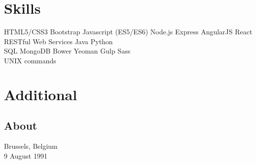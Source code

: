 \documentclass[letterpaper]{my-resume} %
\begin{document}
\begin{minipage}[t]{0.33\textwidth}
\sectionspace %


\section{Skills}

HTML5/CSS3 \textbullet{} Bootstrap \textbullet{} Javascript (ES5/ES6) \textbullet{} Node.js \textbullet{} Express \textbullet{} AngularJS \textbullet{} React \textbullet{} RESTful Web Services \textbullet{} Java \textbullet{} Python \\
SQL \textbullet{} MongoDB \textbullet{} Bower \textbullet{} Yeoman \textbullet{} Gulp \textbullet{} Sass \\
UNIX commands


\sectionspace %


\section{Additional}

\subsection{About}

Brussels, Belgium \\
9 August 1991 


\end{minipage}
\end{document}

